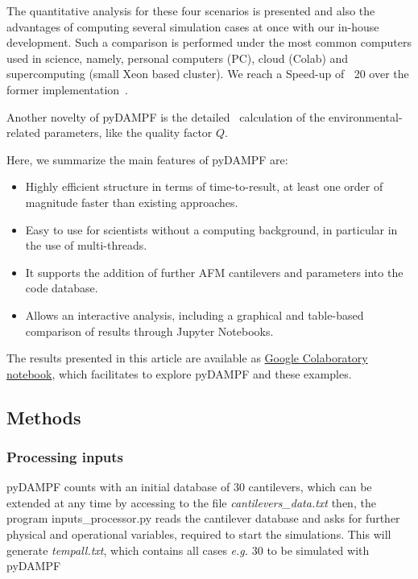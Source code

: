 \documentclass[letterpaper,compsoc,twoside]{IEEEtran}
\providecommand*{\DUrole}[2]{%
  \ifcsname DUrole#1\endcsname%
    \csname DUrole#1\endcsname{#2}%
  \else
    \ifcsname docutilsrole#1\endcsname%
      \PackageWarningNoLine{docutils}{Command prefix "docutilsrole" is
         deprecated, \MessageBreak use `\protect\DUrole #1`}
      \csname docutilsrole#1\endcsname{#2}%
    \else%
      #2%
    \fi%
  \fi%
}
\begin{document}
The quantitative analysis for these four scenarios is presented and also the advantages of computing several simulation cases at once with our in-house development. Such a comparison is performed under the most common computers used in science, namely, personal computers (PC), cloud (Colab) and supercomputing (small Xeon based cluster). We reach a Speed-up of $~$ 20 over the former implementation~\cite{dForce}.

Another novelty of pyDAMPF is the detailed~\cite{Sader} calculation of the environmental-related parameters, like the quality factor $Q$. 

Here, we summarize the main features of pyDAMPF are:
\begin{itemize}
\item 

Highly efficient structure in terms of time-to-result, at least one order of magnitude faster than existing approaches.
\item 
Easy to use for scientists without a computing background, in particular in the use of multi-threads.
\item
It supports the addition of further AFM cantilevers and parameters into the code database.
\item 

Allows an interactive analysis, including a graphical and table-based comparison of results through Jupyter Notebooks.
\end{itemize}



The results presented in this article are available as \href{https://colab.research.google.com/drive/1ZM_aQsuYWUD2gnhcIhngpypJ6m1MbFxE?usp=sharing}{Google
Colaboratory notebook}, which facilitates to explore pyDAMPF and these examples.

\subsection{Methods%
  \label{Methods}%
}

\subsubsection{Processing inputs%
  \label{inputs}%
}
pyDAMPF counts with an initial database of 30 cantilevers, which can be extended at any time by accessing to the file \textit{cantilevers\_data.txt} then, the program inputs\_processor.py  reads the cantilever database and asks for further physical and operational variables, required to start the simulations. This will generate \textit{tempall.txt}, which contains all cases \textit{e.g.} 30 to be simulated with pyDAMPF
\end{document}
